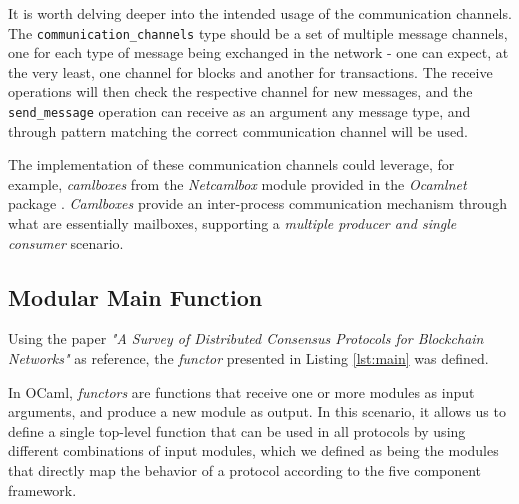 It is worth delving deeper into the intended usage of the communication channels. The \texttt{communication\_channels} type should be a set of multiple message channels, one for each type of message being exchanged in the network - one can expect, at the very least, one channel for blocks and another for transactions. The receive operations will then check the respective channel for new messages, and the \texttt{send\_message} operation can receive as an argument any message type, and through pattern matching the correct communication channel will be used.

The implementation of these communication channels could leverage, for example, \textit{camlboxes} from the \textit{Netcamlbox} module provided in the \textit{Ocamlnet} package \cite{ocamlnet}. \textit{Camlboxes} provide an inter-process communication mechanism through what are essentially mailboxes, supporting a \textit{multiple producer and single consumer} scenario.









\subsection{Modular Main Function}

Using the paper \textit{"A Survey of Distributed Consensus Protocols for Blockchain Networks"} \cite{survey_bchain_networks} as reference, the \textit{functor} presented in Listing \ref{lst:main} was defined.

In OCaml, \textit{functors} are functions that receive one or more modules as input arguments, and produce a new module as output. In this scenario, it allows us to define a single top-level function that can be used in all protocols by using different combinations of input modules, which we defined as being the modules that directly map the behavior of a protocol according to the five component framework.

